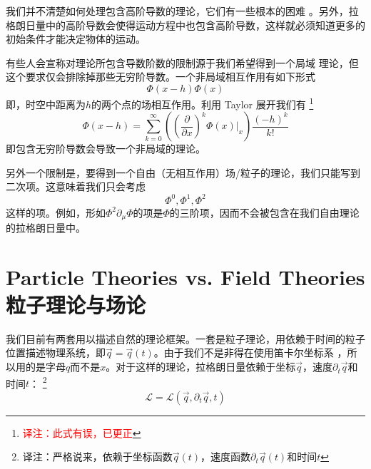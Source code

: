 我们并不清楚如何处理包含高阶导数的理论，它们有一些根本的困难%
%
。另外，拉格朗日量中的高阶导数会使得运动方程中也包含高阶导数，这样就必须知道更多的初始条件才能决定物体的运动。

有些人会宣称对理论所包含导数阶数的限制源于我们希望得到一个局域%
%
理论，但这个要求仅会排除掉那些无穷阶导数。一个非局域相互作用有如下形式%
\begin{equation}
\Phi(x-h)\Phi(x)
\end{equation}
即，时空中距离为\(h\)的两个点的场相互作用。利用 Taylor 展开我们有%
\footnote{\textcolor{red}{译注：此式有误，已更正}}
\begin{equation}
\Phi(x-h) = \sum\limits_{k=0}^{\infty}\left(\left(\frac{\partial}{\partial x}\right)^k\left.\Phi(x)\right|_{x}\right) \frac{(-h)^k}{k!}
\end{equation}
即包含无穷阶导数会导致一个非局域的理论。

另外一个限制是，要得到一个自由（无相互作用）场/粒子的理论，我们只能写到二次项。这意味着我们只会考虑%
\[
\Phi^0, \Phi^1, \Phi^2
\]
这样的项。例如，形如\(\Phi^2 \partial_\mu \Phi\)的项是\(\Phi\)的三阶项，因而不会被包含在我们自由理论的拉格朗日量中。

\section[粒子理论与场论]{Particle Theories vs. Field Theories \quad 粒子理论与场论}\label{sec4.3}
我们目前有两套用以描述自然的理论框架。一套是粒子理论，用依赖于时间的粒子位置描述物理系统，即\(\vec{q}=\vec{q}(t)\)。由于我们不是非得在使用笛卡尔坐标系%
%
，所以用的是字母\(q\)而不是\(x\)。对于这样的理论，拉格朗日量依赖于坐标\(\vec{q}\)，速度\(\partial_t\vec{q}\)和时间\(t\)：%
\footnote{译注：严格说来，依赖于坐标函数\(\vec{q}(t)\)，速度函数\(\partial_t\vec{q}(t)\)和时间\(t\)}
\begin{equation}
{\mathcal L} = {\mathcal L} (\vec{q},\partial_t\vec{q},t)
\end{equation}


